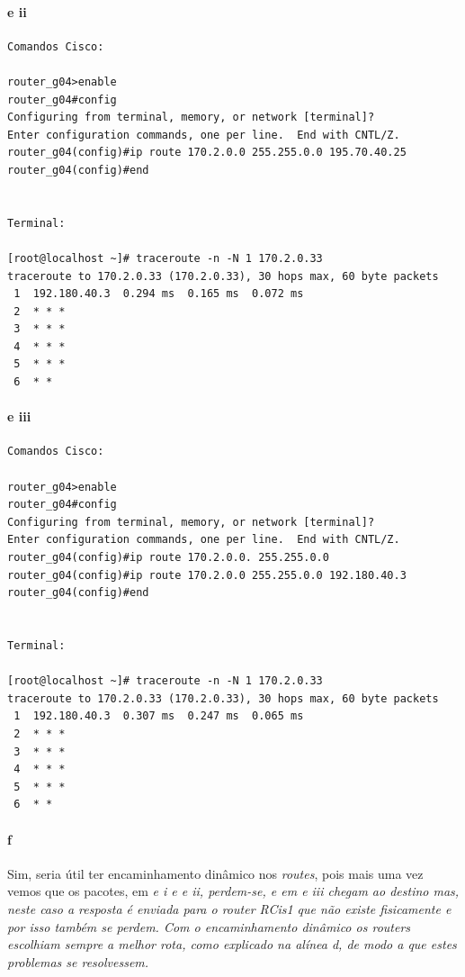 \paragraph{e ii}
\begin{verbatim}
Comandos Cisco:

router_g04>enable
router_g04#config
Configuring from terminal, memory, or network [terminal]? 
Enter configuration commands, one per line.  End with CNTL/Z.
router_g04(config)#ip route 170.2.0.0 255.255.0.0 195.70.40.25
router_g04(config)#end


Terminal:

[root@localhost ~]# traceroute -n -N 1 170.2.0.33
traceroute to 170.2.0.33 (170.2.0.33), 30 hops max, 60 byte packets
 1  192.180.40.3  0.294 ms  0.165 ms  0.072 ms                                                             
 2  * * *                                                                
 3  * * *                                                                
 4  * * *                                                                
 5  * * *                                                                
 6  * *
\end{verbatim}
\paragraph{e iii}
\begin{verbatim}
Comandos Cisco:

router_g04>enable
router_g04#config
Configuring from terminal, memory, or network [terminal]? 
Enter configuration commands, one per line.  End with CNTL/Z.
router_g04(config)#ip route 170.2.0.0. 255.255.0.0
router_g04(config)#ip route 170.2.0.0 255.255.0.0 192.180.40.3 
router_g04(config)#end


Terminal:

[root@localhost ~]# traceroute -n -N 1 170.2.0.33
traceroute to 170.2.0.33 (170.2.0.33), 30 hops max, 60 byte packets
 1  192.180.40.3  0.307 ms  0.247 ms  0.065 ms  
 2  * * *                                                                
 3  * * *                                                                
 4  * * *                                                                
 5  * * *                                                                
 6  * *
\end{verbatim}

\paragraph{f}
Sim, seria útil ter encaminhamento dinâmico nos \emph{routes}, pois mais uma vez vemos que os pacotes, em \it{e i} e \it{e ii}, perdem-se, e em \it{e iii} chegam ao destino mas, neste caso a resposta é enviada para o \emph{router} \textsf{RCis1} que não existe fisicamente e por isso também se perdem. Com o encaminhamento dinâmico os \emph{routers} escolhiam sempre a melhor rota, como explicado na alínea \it{d}, de modo a que estes problemas se resolvessem.


